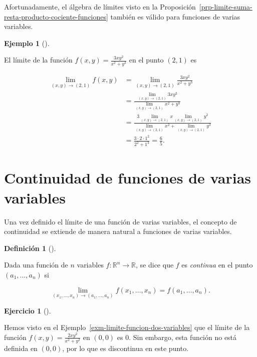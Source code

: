 \documentclass[
  a4paper,
]{scrreport}
\theoremstyle{definition}
\newtheorem{definition}{Definición}[chapter]
\theoremstyle{plain}
\theoremstyle{plain}
\theoremstyle{definition}
\newtheorem{exercise}{Ejercicio}[chapter]
\theoremstyle{definition}
\newtheorem{example}{Ejemplo}[chapter]
\theoremstyle{plain}
\theoremstyle{remark}
\begin{document}
Afortunadamente, el álgebra de límites visto en la
Proposición~\ref{prp-limite-suma-resta-producto-cociente-funciones}
también es válido para funciones de varias variables.

\begin{example}[]\protect\hypertarget{exm-algebra-limites-funciones-varias-variables}{}\label{exm-algebra-limites-funciones-varias-variables}

El límite de la función \(f(x,y)=\frac{3xy^2}{x^2+y^3}\) en el punto
\((2,1)\) es

\begin{align*}
\lim_{(x,y)\to(2,1)} f(x,y) 
&= \lim_{(x,y)\to(2,1)} \frac{3xy^2}{x^2+y^3} \\
&= \frac{\lim_{(x,y)\to(2,1)} 3xy^2}{\lim_{(x,y)\to(2,1)} x^2+y^3} \\
&= \frac{3\lim_{(x,y)\to(2,1)} x\lim_{(x,y)\to(2,1)}y^2}{\lim_{(x,y)\to(2,1)} x^2+\lim_{(x,y)\to(2,1)}y^3} \\
&= \frac{3\cdot 2\cdot 1^2}{2^2 + 1^3} 
= \frac{6}{5}.
\end{align*}

\end{example}

\hypertarget{continuidad-de-funciones-de-varias-variables}{%
\section{Continuidad de funciones de varias
variables}\label{continuidad-de-funciones-de-varias-variables}}

Una vez definido el límite de una función de varias variables, el
concepto de continuidad se extiende de manera natural a funciones de
varias variables.

\begin{definition}[]\protect\hypertarget{def-funcion-varias-variables-continua}{}\label{def-funcion-varias-variables-continua}

Dada una función de \(n\) variables
\(f:\mathbb{R}^n\rightarrow \mathbb{R}\), se dice que \(f\) es
\emph{continua} en el punto \((a_1, \ldots, a_n)\) si

\[
\lim_{(x_1,\ldots,x_n)\rightarrow (a_1,\ldots,a_n)}f(x_1,\ldots,x_n) = f(a_1,\ldots, a_n).
\]

\end{definition}

\begin{exercise}[]\protect\hypertarget{exr-funcion-varias-variables-discontinua}{}\label{exr-funcion-varias-variables-discontinua}

Hemos visto en el Ejemplo~\ref{exm-limite-funcion-dos-variables} que el
límite de la función \(f(x,y)=\frac{2xy^2}{x^2+y^2}\) en \((0,0)\) es
\(0\). Sin embargo, esta función no está definida en \((0,0)\), por lo
que es discontinua en este punto.

\end{exercise}
\end{document}
